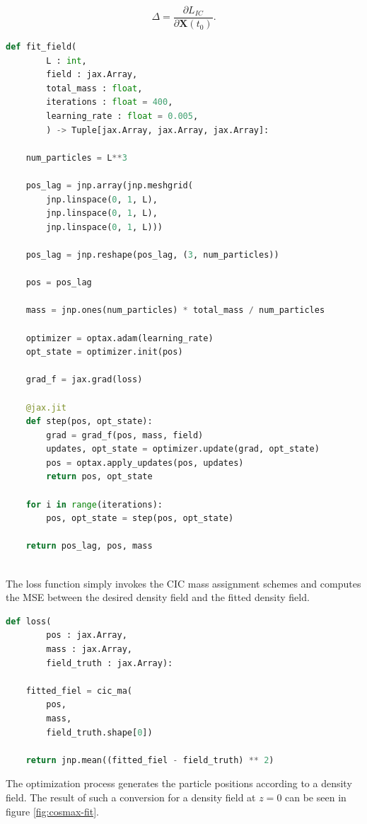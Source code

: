 \documentclass{article}
\begin{document}
{\begin{appendices}
\begin{equation}
    \Delta = \frac{\partial L_{IC}}{\partial \mathbf{X}(t_0)}.
\end{equation}


\begin{lstlisting}[language=Python]
def fit_field(
        L : int,
        field : jax.Array,
        total_mass : float,
        iterations : float = 400,
        learning_rate : float = 0.005,
        ) -> Tuple[jax.Array, jax.Array, jax.Array]:

    num_particles = L**3

    pos_lag = jnp.array(jnp.meshgrid(
        jnp.linspace(0, 1, L),
        jnp.linspace(0, 1, L),
        jnp.linspace(0, 1, L)))

    pos_lag = jnp.reshape(pos_lag, (3, num_particles))

    pos = pos_lag

    mass = jnp.ones(num_particles) * total_mass / num_particles

    optimizer = optax.adam(learning_rate)
    opt_state = optimizer.init(pos)

    grad_f = jax.grad(loss)

    @jax.jit
    def step(pos, opt_state):
        grad = grad_f(pos, mass, field)
        updates, opt_state = optimizer.update(grad, opt_state)
        pos = optax.apply_updates(pos, updates)
        return pos, opt_state
    
    for i in range(iterations):
        pos, opt_state = step(pos, opt_state)

    return pos_lag, pos, mass
        
\end{lstlisting}

The loss function simply invokes the CIC mass assignment schemes and computes the MSE between the desired density field and the fitted density field.

\begin{lstlisting}[language=Python]
def loss(
        pos : jax.Array,
        mass : jax.Array,
        field_truth : jax.Array):
    
    fitted_fiel = cic_ma(
        pos,
        mass,
        field_truth.shape[0])
    
    return jnp.mean((fitted_fiel - field_truth) ** 2)
\end{lstlisting}

The optimization process generates the particle positions according to a density field. The result of such a conversion for a density field at $z=0$ can be seen in figure \ref{fig:cosmax-fit}.


\end{appendices}}
\end{document}
